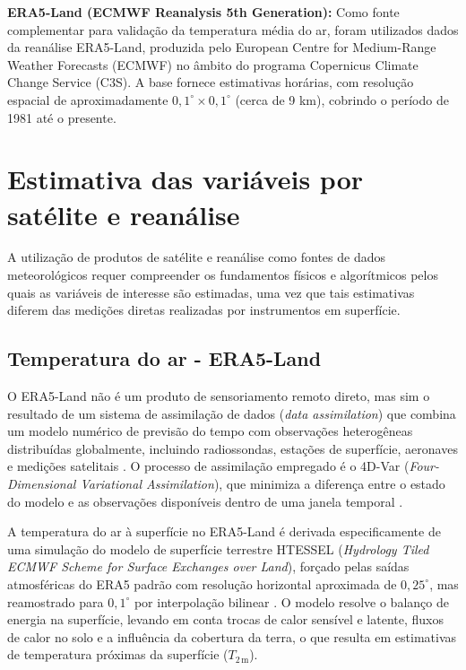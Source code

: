     \textbf{ERA5-Land (ECMWF Reanalysis 5th Generation):} Como fonte complementar para validação da temperatura média do ar, foram utilizados dados da reanálise ERA5-Land, produzida pelo European Centre for Medium-Range Weather Forecasts (ECMWF) no âmbito do programa Copernicus Climate Change Service (C3S). A base fornece estimativas horárias, com resolução espacial de aproximadamente $0{,}1^\circ \times 0{,}1^\circ$ (cerca de 9 km), cobrindo o período de 1981 até o presente.


\section{Estimativa das variáveis por satélite e reanálise}

A utilização de produtos de satélite e reanálise como fontes de dados meteorológicos 
requer compreender os fundamentos físicos e algorítmicos pelos quais as variáveis de 
interesse são estimadas, uma vez que tais estimativas diferem  das medições diretas realizadas por instrumentos em superfície.

\subsection{Temperatura do ar - ERA5-Land}

O ERA5-Land não é um produto de sensoriamento remoto direto, mas sim o resultado de um sistema de assimilação de dados (\textit{data assimilation}) que combina um modelo numérico de previsão do tempo com observações heterogêneas distribuídas globalmente, incluindo radiossondas, estações de superfície, aeronaves e medições satelitais \citep{hersbach2020era5}. O processo de assimilação empregado é o 4D-Var (\textit{Four-Dimensional Variational Assimilation}), que minimiza a diferença entre 
o estado do modelo e as observações disponíveis dentro de uma janela temporal \citep{rabier2005}.

A temperatura do ar à superfície no ERA5-Land é derivada especificamente de uma simulação do modelo de superfície terrestre HTESSEL (\textit{Hydrology Tiled ECMWF 
Scheme for Surface Exchanges over Land}), forçado pelas saídas atmosféricas do ERA5 padrão com resolução horizontal aproximada de $0{,}25^\circ$, mas reamostrado para $0{,}1^\circ$ por interpolação bilinear \citep{munoz2021era5}. O modelo resolve o balanço de energia na superfície, levando em conta trocas de calor sensível e latente, fluxos de calor no solo e a influência da cobertura da terra, o que resulta em estimativas de temperatura próximas da superfície ($T_{2\,\text{m}}$).

